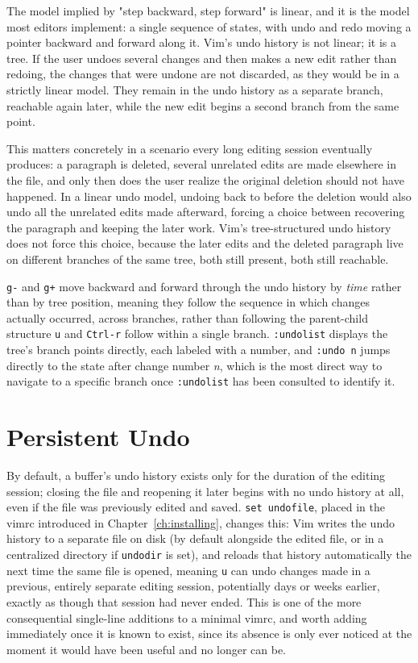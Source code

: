 The model implied by "step backward, step forward" is linear, and it is the model most editors implement: a single sequence of states, with undo and redo moving a pointer backward and forward along it. Vim's undo history is not linear; it is a tree. If the user undoes several changes and then makes a new edit rather than redoing, the changes that were undone are not discarded, as they would be in a strictly linear model. They remain in the undo history as a separate branch, reachable again later, while the new edit begins a second branch from the same point.

This matters concretely in a scenario every long editing session eventually produces: a paragraph is deleted, several unrelated edits are made elsewhere in the file, and only then does the user realize the original deletion should not have happened. In a linear undo model, undoing back to before the deletion would also undo all the unrelated edits made afterward, forcing a choice between recovering the paragraph and keeping the later work. Vim's tree-structured undo history does not force this choice, because the later edits and the deleted paragraph live on different branches of the same tree, both still present, both still reachable.

\texttt{g-} and \texttt{g+} move backward and forward through the undo history by \textit{time} rather than by tree position, meaning they follow the sequence in which changes actually occurred, across branches, rather than following the parent-child structure \texttt{u} and \texttt{Ctrl-r} follow within a single branch. \texttt{:undolist} displays the tree's branch points directly, each labeled with a number, and \texttt{:undo n} jumps directly to the state after change number \textit{n}, which is the most direct way to navigate to a specific branch once \texttt{:undolist} has been consulted to identify it.

\section{Persistent Undo}

By default, a buffer's undo history exists only for the duration of the editing session; closing the file and reopening it later begins with no undo history at all, even if the file was previously edited and saved. \texttt{set undofile}, placed in the vimrc introduced in Chapter~\ref{ch:installing}, changes this: Vim writes the undo history to a separate file on disk (by default alongside the edited file, or in a centralized directory if \texttt{undodir} is set), and reloads that history automatically the next time the same file is opened, meaning \texttt{u} can undo changes made in a previous, entirely separate editing session, potentially days or weeks earlier, exactly as though that session had never ended. This is one of the more consequential single-line additions to a minimal vimrc, and worth adding immediately once it is known to exist, since its absence is only ever noticed at the moment it would have been useful and no longer can be.

